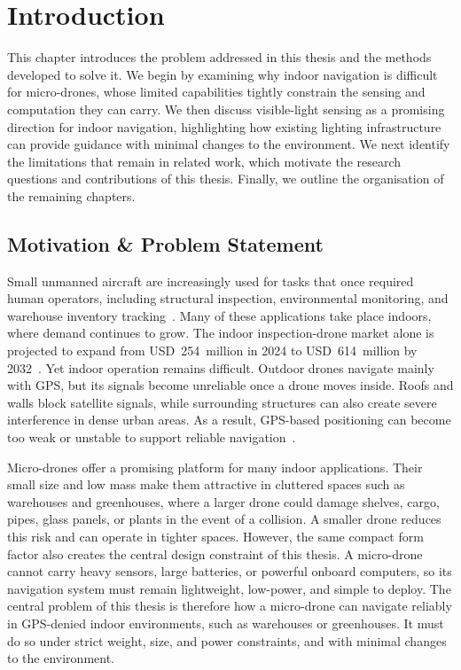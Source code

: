 \chapter{Introduction}
\label{chp:introduction}

This chapter introduces the problem addressed in this thesis and the methods developed to solve it. We begin by examining why indoor navigation is difficult for micro-drones, whose limited capabilities tightly constrain the sensing and computation they can carry. We then discuss visible-light sensing as a promising direction for indoor navigation, highlighting how existing lighting infrastructure can provide guidance with minimal changes to the environment. We next identify the limitations that remain in related work, which motivate the research questions and contributions of this thesis. Finally, we outline the organisation of the remaining chapters.

\section{Motivation \& Problem Statement}

Small unmanned aircraft are increasingly used for tasks that once required human operators, including structural inspection, environmental monitoring, and warehouse inventory tracking~\cite{floreano2015drones}. Many of these applications take place indoors, where demand continues to grow. The indoor inspection-drone market alone is projected to expand from USD~254~million in 2024 to USD~614~million by 2032~\cite{intelmarket2026}. Yet indoor operation remains difficult. Outdoor drones navigate mainly with GPS, but its signals become unreliable once a drone moves inside. Roofs and walls block satellite signals, while surrounding structures can also create severe interference in dense urban areas. As a result, GPS-based positioning can become too weak or unstable to support reliable navigation~\cite{zafari2019indoor}.

Micro-drones offer a promising platform for many indoor applications. Their small size and low mass make them attractive in cluttered spaces such as warehouses and greenhouses, where a larger drone could damage shelves, cargo, pipes, glass panels, or plants in the event of a collision. A smaller drone reduces this risk and can operate in tighter spaces. However, the same compact form factor also creates the central design constraint of this thesis. A micro-drone cannot carry heavy sensors, large batteries, or powerful onboard computers, so its navigation system must remain lightweight, low-power, and simple to deploy. The central problem of this thesis is therefore how a micro-drone can navigate reliably in GPS-denied indoor environments, such as warehouses or greenhouses. It must do so under strict weight, size, and power constraints, and with minimal changes to the environment.

